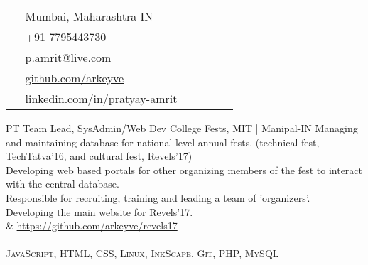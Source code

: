 \documentclass[10pt]{article} %
\begin{document}
\begin{paracol}{2}
\switchcolumn %


\parbox[top][0.12\textheight][c]{\linewidth}{ %
	\vspace{-0.04\textheight} %
	\colorbox{shade}{ %
		\begin{supertabular}{p{0.05\linewidth}|p{0.775\linewidth}} %
			\raisebox{-1pt}{\faHome} & Mumbai, Maharashtra-IN \\ %
			\raisebox{-1pt}{\faPhone} & +91 7795443730 \\ %
			\raisebox{0pt}{\small\faEnvelope} & \href{mailto:p.amrit@live.com}{p.amrit@live.com} \\ %
			\raisebox{-1pt}{\faGithub} & \href{https://github.com/arkeyve}{github.com/arkeyve} \\ %
			\raisebox{-1pt}{\faLinkedinSquare} & \href{https://www.linkedin.com/in/pratyay-amrit}{linkedin.com/in/pratyay-amrit} \\ %
		\end{supertabular}
	}
}

\medskip
\medskip
\medskip

{PT} %
{Team Lead, SysAdmin/Web Dev} %
{College Fests, MIT | Manipal-IN} %
{
\raisebox{-0.5pt}{\faAngleRight} Managing and maintaining database for national level annual fests. (technical fest, TechTatva’16, and cultural fest, Revels’17)\\
\raisebox{-0.5pt}{\faAngleRight} Developing web based portals for other organizing members of the fest to interact with the central database.\\
\raisebox{-0.5pt}{\faAngleRight} Responsible for recruiting, training and leading a team of 'organizers'.\\
\raisebox{-0.5pt}{\faAngleRight} Developing the main website for Revels’17.\\
\raisebox{-1pt}{\faGithub} & \href{https://github.com/arkeyve/revels17}{https://github.com/arkeyve/revels17}\\
\\
\textbf{\faCode} \textsc{JavaScript, HTML, CSS, Linux, InkScape, Git, PHP, MySQL}
} %


\end{paracol}
\end{document}
